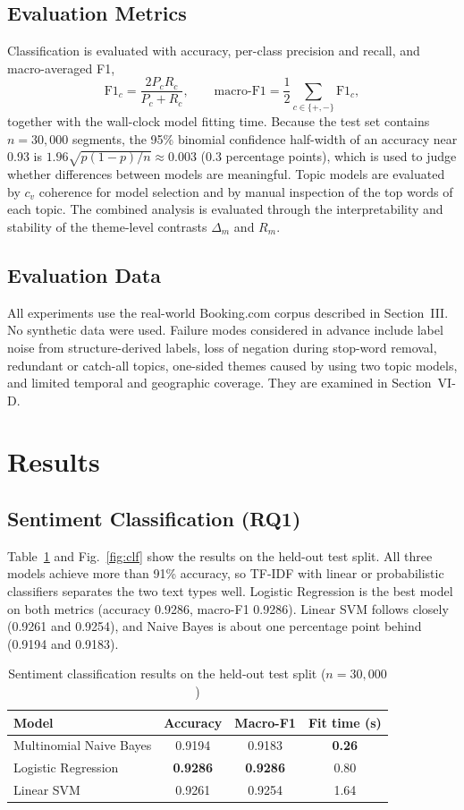 \documentclass[11pt,journal,draftclsnofoot,onecolumn]{IEEEtran}
\begin{document}
\subsection{Evaluation Metrics}
Classification is evaluated with accuracy, per-class precision and recall, and macro-averaged F1,
\begin{equation}
\mathrm{F1}_c=\frac{2P_cR_c}{P_c+R_c},\qquad \text{macro-F1}=\frac{1}{2}\sum_{c\in\{+,-\}}\mathrm{F1}_c,
\end{equation}
together with the wall-clock model fitting time. Because the test set contains $n=30{,}000$ segments, the 95\% binomial confidence half-width of an accuracy near 0.93 is $1.96\sqrt{p(1-p)/n}\approx0.003$ (0.3 percentage points), which is used to judge whether differences between models are meaningful. Topic models are evaluated by $c_v$ coherence for model selection and by manual inspection of the top words of each topic. The combined analysis is evaluated through the interpretability and stability of the theme-level contrasts $\Delta_m$ and $R_m$.

\subsection{Evaluation Data}
All experiments use the real-world Booking.com corpus described in Section~III. No synthetic data were used. Failure modes considered in advance include label noise from structure-derived labels, loss of negation during stop-word removal, redundant or catch-all topics, one-sided themes caused by using two topic models, and limited temporal and geographic coverage. They are examined in Section~VI-D.

\section{Results}
\subsection{Sentiment Classification (RQ1)}
Table~\ref{tab:clf} and Fig.~\ref{fig:clf} show the results on the held-out test split. All three models achieve more than 91\% accuracy, so TF-IDF with linear or probabilistic classifiers separates the two text types well. Logistic Regression is the best model on both metrics (accuracy 0.9286, macro-F1 0.9286). Linear SVM follows closely (0.9261 and 0.9254), and Naive Bayes is about one percentage point behind (0.9194 and 0.9183).

\begin{table}[!t]
\caption{Sentiment classification results on the held-out test split ($n=30{,}000$)}
\label{tab:clf}
\centering
\begin{tabular}{lccc}
\toprule
Model & Accuracy & Macro-F1 & Fit time (s) \\
\midrule
Multinomial Naive Bayes & 0.9194 & 0.9183 & \textbf{0.26} \\
Logistic Regression & \textbf{0.9286} & \textbf{0.9286} & 0.80 \\
Linear SVM & 0.9261 & 0.9254 & 1.64 \\
\bottomrule
\end{tabular}
\end{table}
\end{document}
